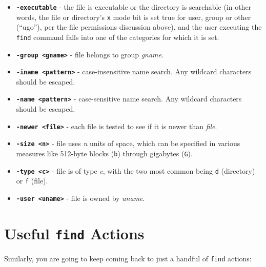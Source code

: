 \documentclass[10pt,]{book}
\numberwithin{figure}{chapter}
\begin{document}
\begin{itemize}
\item
  \textbf{\texttt{-executable}} - the file is executable or the
  directory is searchable (in other words, the file or directory's
  \texttt{x} mode bit is set true for user, group or other (``ugo''),
  per the file permissions discussion above), and the user executing the
  \texttt{find} command falls into one of the categories for which it is
  set.
\item
  \textbf{\texttt{-group \textless{}gname\textgreater{}}} - file belongs
  to group \emph{gname}.
\item
  \textbf{\texttt{-iname \textless{}pattern\textgreater{}}} -
  case-insensitive name search. Any wildcard characters should be
  escaped.
\item
  \textbf{\texttt{-name \textless{}pattern\textgreater{}}} -
  case-sensitive name search. Any wildcard characters should be escaped.
\item
  \textbf{\texttt{-newer \textless{}file\textgreater{}}} - each file is
  tested to see if it is newer than \emph{file}.
\item
  \textbf{\texttt{-size \textless{}n\textgreater{}}} - file uses
  \emph{n} units of space, which can be specified in various measures
  like 512-byte blocks (\texttt{b}) through gigabytes (\texttt{G}).
\item
  \textbf{\texttt{-type \textless{}c\textgreater{}}} - file is of type
  \emph{c}, with the two most common being \texttt{d} (directory) or
  \texttt{f} (file).
\item
  \textbf{\texttt{-user \textless{}uname\textgreater{}}} - file is owned
  by \emph{uname}.
\end{itemize}

\section{Useful \texttt{find} Actions}\label{useful-find-actions}

Similarly, you are going to keep coming back to just a handful of
\texttt{find} actions:
\end{document}
